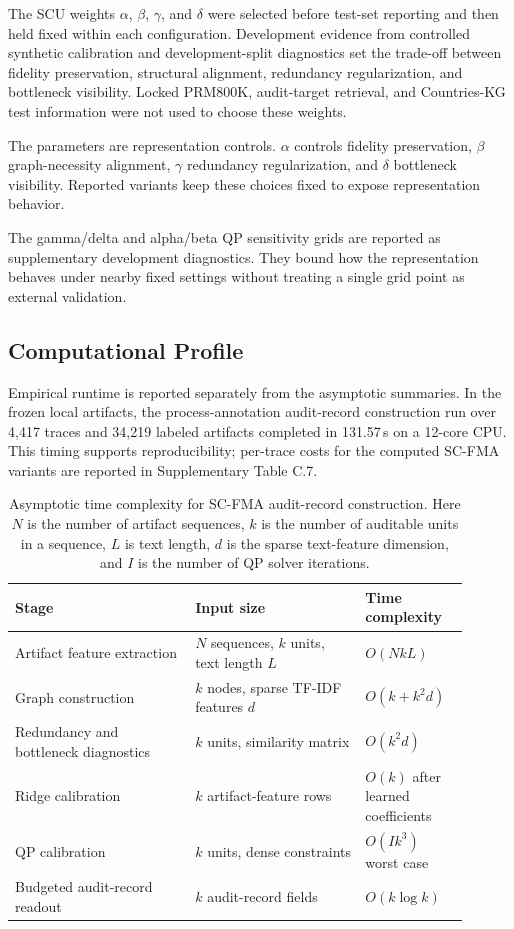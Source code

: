 \documentclass[a4paper,fleqn]{cas-sc}
\begin{document}
The SCU weights $\alpha$, $\beta$, $\gamma$, and $\delta$ were selected before test-set reporting and then held fixed within each configuration. Development evidence from controlled synthetic calibration and development-split diagnostics set the trade-off between fidelity preservation, structural alignment, redundancy regularization, and bottleneck visibility. Locked PRM800K, audit-target retrieval, and Countries-KG test information were not used to choose these weights.

The parameters are representation controls. $\alpha$ controls fidelity preservation, $\beta$ graph-necessity alignment, $\gamma$ redundancy regularization, and $\delta$ bottleneck visibility. Reported variants keep these choices fixed to expose representation behavior.

The gamma/delta and alpha/beta QP sensitivity grids are reported as supplementary development diagnostics. They bound how the representation behaves under nearby fixed settings without treating a single grid point as external validation.

\subsection{Computational Profile}

Empirical runtime is reported separately from the asymptotic summaries. In the frozen local artifacts, the process-annotation audit-record construction run over 4,417 traces and 34,219 labeled artifacts completed in 131.57\,s on a 12-core CPU. This timing supports reproducibility; per-trace costs for the computed SC-FMA variants are reported in Supplementary Table C.7.

\begin{table}[ht]
\caption{Asymptotic time complexity for SC-FMA audit-record construction. Here $N$ is the number of artifact sequences, $k$ is the number of auditable units in a sequence, $L$ is text length, $d$ is the sparse text-feature dimension, and $I$ is the number of QP solver iterations.}
\label{tab:complexity-summary}
\centering
\small
\renewcommand{\arraystretch}{1.08}
\begin{tabular}{p{0.36\linewidth}p{0.34\linewidth}p{0.20\linewidth}}
\toprule
\textbf{Stage} & \textbf{Input size} & \textbf{Time complexity} \\
\midrule
Artifact feature extraction & $N$ sequences, $k$ units, text length $L$ & $O(NkL)$ \\
Graph construction & $k$ nodes, sparse TF-IDF features $d$ & $O(k+k^2d)$ \\
Redundancy and bottleneck diagnostics & $k$ units, similarity matrix & $O(k^2d)$ \\
Ridge calibration & $k$ artifact-feature rows & $O(k)$ after learned coefficients \\
QP calibration & $k$ units, dense constraints & $O(Ik^3)$ worst case \\
Budgeted audit-record readout & $k$ audit-record fields & $O(k\log k)$ \\
\bottomrule
\end{tabular}
\end{table}
\end{document}

